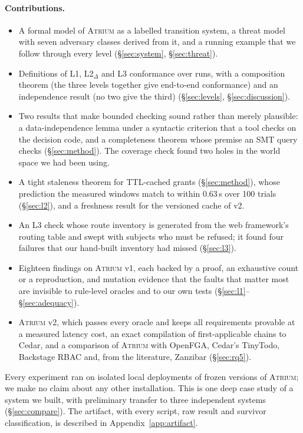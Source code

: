 \documentclass[sigconf,review,anonymous]{acmart}
\newcommand{\sysname}{\textsc{Atrium}\xspace}
\newcommand{\sysname}{\textsc{OpenZTAC}\xspace}
\begin{document}
\paragraph{Contributions.}
\begin{itemize}
\item A formal model of \sysname as a labelled transition system, a threat model with seven adversary classes
derived from it, and a running example that we follow through every level (\S\ref{sec:system},
\S\ref{sec:threat}).
\item Definitions of L1, L2$_\Delta$ and L3 conformance over runs, with a composition theorem (the three levels
together give end-to-end conformance) and an independence result (no two give the third)
(\S\ref{sec:levels}, \S\ref{sec:discussion}).
\item Two results that make bounded checking sound rather than merely plausible: a data-independence lemma
under a syntactic criterion that a tool checks on the decision code, and a completeness theorem whose premise
an SMT query checks (\S\ref{sec:method}). The coverage check found two holes in the world space we had been
using.
\item A tight staleness theorem for TTL-cached grants (\S\ref{sec:method}), whose prediction the measured windows
match to within 0.63\,s over 100 trials (\S\ref{sec:l2}), and a freshness result for the versioned cache of v2.
\item An L3 check whose route inventory is generated from the web framework's routing table and swept with
subjects who must be refused; it found four failures that our hand-built inventory had missed (\S\ref{sec:l3}).
\item Eighteen findings on \sysname v1, each backed by a proof, an exhaustive count or a reproduction, and
mutation evidence that the faults that matter most are invisible to rule-level oracles and to our own tests
(\S\ref{sec:l1}--\S\ref{sec:adequacy}).
\item \sysname v2, which passes every oracle and keeps all requirements provable at a measured latency cost, an
exact compilation of first-applicable chains to Cedar, and a comparison of \sysname with OpenFGA, Cedar's
TinyTodo, Backstage RBAC and, from the literature, Zanzibar (\S\ref{sec:rq5}).
\end{itemize}
Every experiment ran on isolated local deployments of frozen versions of \sysname; we make no claim about any
other installation. This is one deep case study of a system we built, with preliminary transfer to three
independent systems (\S\ref{sec:compare}). The artifact, with every script, raw result and survivor
classification, is described in Appendix~\ref{app:artifact}.
\end{document}
